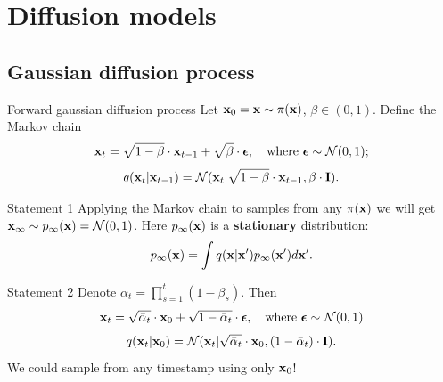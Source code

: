 \section{Diffusion models}
\subsection{Gaussian diffusion process}
\begin{frame}{Forward gaussian diffusion process}
	Let $\mathbf{x}_0 = \mathbf{x} \sim \pi(\mathbf{x})$, $\beta \in (0, 1)$. Define the Markov chain
	\[
		\mathbf{x}_t = \sqrt{1 - \beta} \cdot \mathbf{x}_{t - 1} + \sqrt{\beta} \cdot \boldsymbol{\epsilon}, \quad \text{where }\boldsymbol{\epsilon} \sim \mathcal{N}(0, 1);
	\]
	\[
		q(\mathbf{x}_t | \mathbf{x}_{t-1}) = \mathcal{N}(\mathbf{x}_t | \sqrt{1 - \beta} \cdot \mathbf{x}_{t-1}, \beta \cdot \mathbf{I}).
	\]
	\vspace{-0.6cm}
	\begin{block}{Statement 1}
		Applying the Markov chain to samples from any $\pi(\mathbf{x})$ we will get $\mathbf{x}_{\infty} \sim p_{\infty}(\mathbf{x}) = \mathcal{N}(0, 1)$. Here $p_{\infty}(\mathbf{x})$ is a \textbf{stationary} distribution:
		\vspace{-0.2cm}
		\[
			p_{\infty}(\mathbf{x}) = \int q(\mathbf{x} | \mathbf{x}') p_{\infty}(\mathbf{x}') d \mathbf{x}'. 
		\]
		\vspace{-0.8cm}
	\end{block}
	\begin{block}{Statement 2}
		Denote $\bar{\alpha}_t = \prod_{s=1}^t (1 - \beta_s)$. Then 
		\vspace{-0.2cm}
		\[
			\mathbf{x}_t = \sqrt{\bar{\alpha}_t} \cdot \mathbf{x}_{0} + \sqrt{1 - \bar{\alpha}_t} \cdot \boldsymbol{\epsilon}, \quad \text{where } \boldsymbol{\epsilon} \sim \mathcal{N}(0, 1)
		\]
		\vspace{-0.7cm}
		\[
			q(\mathbf{x}_t | \mathbf{x}_0) = \mathcal{N}(\mathbf{x}_t | \sqrt{\bar{\alpha}_t} \cdot \mathbf{x}_0, (1 - \bar{\alpha}_t) \cdot \mathbf{I}).
		\]
		We could sample from any timestamp using only $\mathbf{x}_0$!
	\end{block}
\end{frame}
